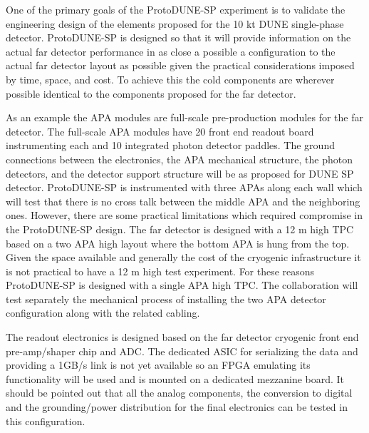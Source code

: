 One of the primary goals of the ProtoDUNE-SP experiment is to validate the engineering design of the elements proposed for the 10 kt DUNE single-phase detector. ProtoDUNE-SP is designed so that it will provide information on the actual far detector performance in as close a possible a configuration to the actual far detector layout as possible given the practical considerations imposed by time, space, and cost. To achieve this the cold components are wherever possible identical to the components proposed for the far detector. 

As an example the APA modules are full-scale pre-production modules for the far detector. The full-scale APA modules have 20 front end readout board instrumenting each and 10 integrated photon detector paddles. The ground connections between the electronics, the APA mechanical structure, the photon detectors, and the detector support structure will be as proposed for DUNE SP detector. ProtoDUNE-SP is instrumented with three APAs along each wall which will test that there is no cross talk between the middle APA and the neighboring ones. However, there are some practical limitations which required compromise in the ProtoDUNE-SP design. The far detector is designed with a 12 m high TPC based on a two APA high layout where the bottom APA is hung from the top. Given the space available and generally the cost of the cryogenic infrastructure it is not practical to have a 12 m high test experiment. For these reasons ProtoDUNE-SP is designed with a single APA high TPC. The collaboration will test separately the mechanical process of installing the two APA detector configuration along with the related cabling.

The readout electronics is designed based on the far detector cryogenic front end pre-amp/shaper chip and ADC.  The dedicated ASIC for serializing the data and providing a 1GB/s link is not yet available so an FPGA emulating its functionality will be used and is mounted on a dedicated mezzanine board. It should be pointed out that all the analog components, the conversion to digital and the grounding/power distribution for the final electronics can be tested in this configuration. 

